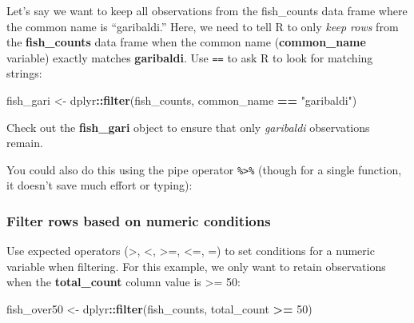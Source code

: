 \documentclass[]{book}
\newenvironment{Shaded}{\begin{snugshade}}{\end{snugshade}}
\newcommand{\DecValTok}[1]{\textcolor[rgb]{0.00,0.00,0.81}{#1}}
\newcommand{\KeywordTok}[1]{\textcolor[rgb]{0.13,0.29,0.53}{\textbf{#1}}}
\newcommand{\NormalTok}[1]{#1}
\newcommand{\OperatorTok}[1]{\textcolor[rgb]{0.81,0.36,0.00}{\textbf{#1}}}
\newcommand{\StringTok}[1]{\textcolor[rgb]{0.31,0.60,0.02}{#1}}
\begin{document}
Let's say we want to keep all observations from the fish\_counts data frame where the common name is ``garibaldi.'' Here, we need to tell R to only \emph{keep rows} from the \textbf{fish\_counts} data frame when the common name (\textbf{common\_name} variable) exactly matches \textbf{garibaldi}.
Use \texttt{==} to ask R to look for matching strings:

\begin{Shaded}
\begin{Highlighting}[]
\NormalTok{fish_gari <-}\StringTok{ }\NormalTok{dplyr}\OperatorTok{::}\KeywordTok{filter}\NormalTok{(fish_counts, common_name }\OperatorTok{==}\StringTok{ "garibaldi"}\NormalTok{)}
\end{Highlighting}
\end{Shaded}

Check out the \textbf{fish\_gari} object to ensure that only \emph{garibaldi} observations remain.

You could also do this using the pipe operator \texttt{\%\textgreater{}\%} (though for a single function, it doesn't save much effort or typing):

\begin{Shaded}
\end{Shaded}

\hypertarget{filter-rows-based-on-numeric-conditions}{%
\subsubsection{Filter rows based on numeric conditions}\label{filter-rows-based-on-numeric-conditions}}

Use expected operators (\textgreater{}, \textless{}, \textgreater{}=, \textless{}=, =) to set conditions for a numeric variable when filtering. For this example, we only want to retain observations when the \textbf{total\_count} column value is \textgreater{}= 50:

\begin{Shaded}
\begin{Highlighting}[]
\NormalTok{fish_over50 <-}\StringTok{ }\NormalTok{dplyr}\OperatorTok{::}\KeywordTok{filter}\NormalTok{(fish_counts, total_count }\OperatorTok{>=}\StringTok{ }\DecValTok{50}\NormalTok{)}
\end{Highlighting}
\end{Shaded}
\end{document}
